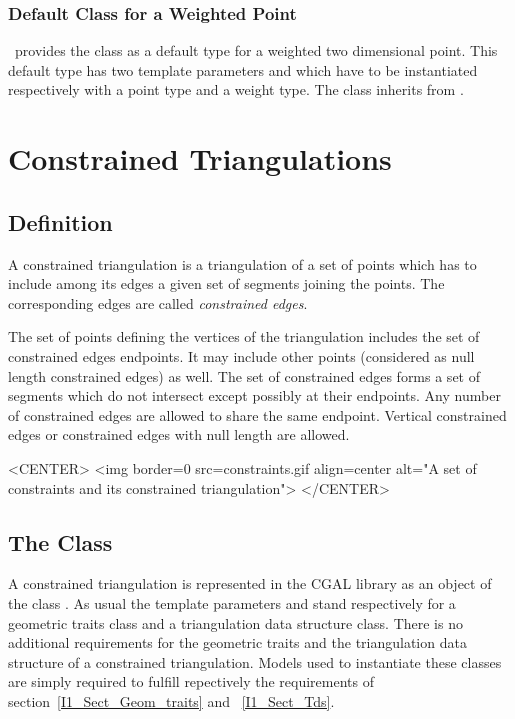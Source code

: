 \subsubsection{Default Class for a Weighted Point}
\cgal\ provides the class 
as a default type for a  weighted two dimensional point.
This default type has two template parameters 
and   which have to be instantiated respectively 
with a point type and a weight type.
The class 
 inherits from .




\section{Constrained Triangulations}
\label{I1_Sect_Constrained}


\subsection{Definition}
A constrained triangulation is a triangulation of a set of points
which has to include among its edges 
a given set of segments joining the points. The corresponding 
edges are called {\em constrained edges}. 

The set of points defining the vertices of the triangulation
includes the set of constrained edges endpoints. It may include other points
(considered as null length constrained edges) as well.  The set of
constrained edges forms a set of segments which do not intersect
except possibly at their endpoints.  Any number of constrained edges
are allowed to share the same endpoint.  Vertical constrained edges or
constrained edges with null length are allowed.


\begin{ccTexOnly}
\begin{center}   \end{center}
\end{ccTexOnly}
 
\begin{ccHtmlOnly}
<CENTER>
<img border=0 src=constraints.gif align=center alt="A set of
constraints and its constrained triangulation">
</CENTER>
\end{ccHtmlOnly}

\subsection{ The Class \protect {}}
A constrained triangulation is represented in the CGAL library as an
object of the class .
As usual the template parameters  and 
stand respectively for a geometric traits class and
a triangulation data structure class. There is no additional
requirements for the geometric traits and the triangulation data
structure of a constrained triangulation.
Models used to instantiate these classes are simply required
to fulfill repectively the requirements 
of section~\ref{I1_Sect_Geom_traits} and ~\ref{I1_Sect_Tds}.


